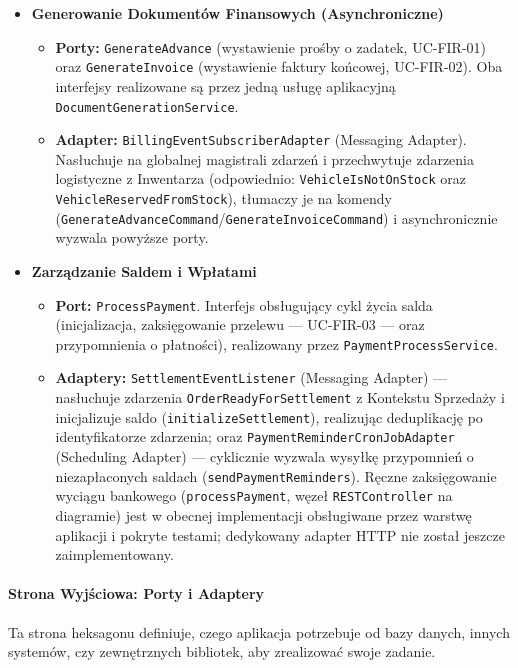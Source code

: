 \begin{itemize}
    \item \textbf{Generowanie Dokumentów Finansowych (Asynchroniczne)}
    \begin{itemize}
        \item \textbf{Porty:} \texttt{GenerateAdvance} (wystawienie prośby o zadatek, UC-FIR-01) oraz \texttt{GenerateInvoice} (wystawienie faktury końcowej, UC-FIR-02). Oba interfejsy realizowane są przez jedną usługę aplikacyjną \texttt{DocumentGenerationService}.
        \item \textbf{Adapter:} \texttt{BillingEventSubscriberAdapter} (Messaging Adapter). Nasłuchuje na globalnej magistrali zdarzeń i przechwytuje zdarzenia logistyczne z Inwentarza (odpowiednio: \texttt{VehicleIsNotOnStock} oraz \texttt{VehicleReservedFromStock}), tłumaczy je na komendy (\texttt{GenerateAdvanceCommand}/\texttt{GenerateInvoiceCommand}) i asynchronicznie wyzwala powyższe porty.
    \end{itemize}

    \item \textbf{Zarządzanie Saldem i Wpłatami}
    \begin{itemize}
        \item \textbf{Port:} \texttt{ProcessPayment}. Interfejs obsługujący cykl życia salda (inicjalizacja, zaksięgowanie przelewu — UC-FIR-03 — oraz przypomnienia o płatności), realizowany przez \texttt{PaymentProcessService}.
        \item \textbf{Adaptery:} \texttt{SettlementEventListener} (Messaging Adapter) — nasłuchuje zdarzenia \texttt{OrderReadyForSettlement} z Kontekstu Sprzedaży i inicjalizuje saldo (\texttt{initializeSettlement}), realizując deduplikację po identyfikatorze zdarzenia; oraz \texttt{PaymentReminderCronJobAdapter} (Scheduling Adapter) — cyklicznie wyzwala wysyłkę przypomnień o niezapłaconych saldach (\texttt{sendPaymentReminders}). Ręczne zaksięgowanie wyciągu bankowego (\texttt{processPayment}, węzeł \texttt{RESTController} na diagramie) jest w obecnej implementacji obsługiwane przez warstwę aplikacji i pokryte testami; dedykowany adapter HTTP nie został jeszcze zaimplementowany.
    \end{itemize}
\end{itemize}

\paragraph{Strona Wyjściowa: Porty i Adaptery} 
Ta strona heksagonu definiuje, czego aplikacja potrzebuje od bazy danych, innych systemów, czy zewnętrznych bibliotek, aby zrealizować swoje zadanie.

